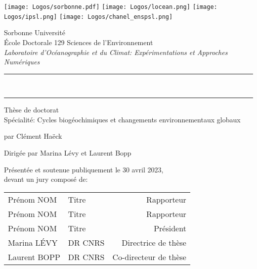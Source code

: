 

\begin{titlingpage}

\begin{center}
  \texttt{[image: Logos/sorbonne.pdf]}
  \hfill
  \texttt{[image: Logos/locean.png]}
  \hfill
  \texttt{[image: Logos/ipsl.png]}
  \hfill
  \texttt{[image: Logos/chanel\_enspsl.png]}

  \vspace{1cm}

  {\LARGE Sorbonne Université}\\[2ex]
  École Doctorale 129 Sciences de l'Environnement\\
  \emph{Laboratoire d'Océanographie et du Climat: Expérimentations et Approches Numériques}

  \vspace{3cm}

  \par\noindent\rule[0.7em]{\textwidth}{2pt}
  {\bfseries\Large \Title}\\
  \par\noindent\rule{\textwidth}{2pt}

  \vspace{3cm}

  Thèse de doctorat\\
  Spécialité: Cycles biogéochimiques et changements environnementaux globaux

  \vspace{1cm}

  {\normalsize par Clément Haëck}

  \vspace{1cm}

  Dirigée par Marina Lévy et Laurent Bopp

  \vspace{2cm}
\end{center}

\par\noindent Présentée et soutenue publiquement le 30 avril 2023,\\
devant un jury composé de:

\begin{center}
\begin{tabular}{llr<{\raggedleft}}
  Prénom NOM & Titre & Rapporteur \\
  Prénom NOM & Titre & Rapporteur \\
  Prénom NOM & Titre & Président \\
  Marina LÉVY & DR CNRS & Directrice de thèse \\
  Laurent BOPP & DR CNRS & Co-directeur de thèse \\
\end{tabular}
\end{center}

\end{titlingpage}

\restoregeometry
